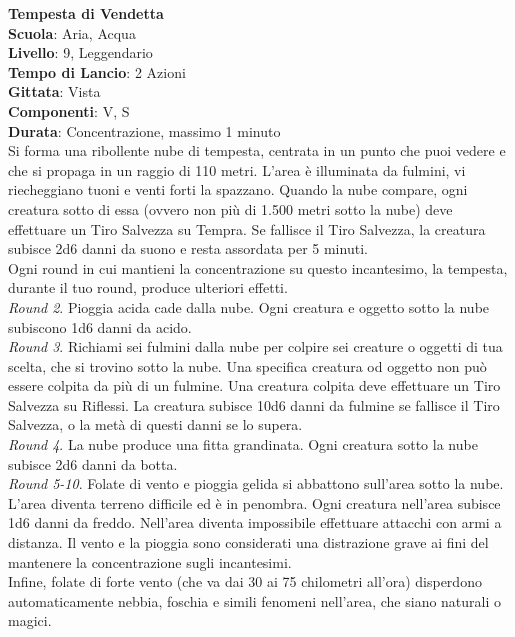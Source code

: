 \begin{multicols}{2}
\medskip\textbf{Tempesta di Vendetta}\\
\textbf{Scuola}: Aria, Acqua\\
\textbf{Livello}: 9, Leggendario\\
\textbf{Tempo di Lancio}: 2 Azioni\\
\textbf{Gittata}: Vista\\
\textbf{Componenti}: V, S\\
\textbf{Durata}: Concentrazione, massimo 1 minuto\\
Si forma una ribollente nube di tempesta, centrata in un punto che puoi vedere e che si propaga in un raggio di 110 metri. L'area è illuminata da fulmini, vi riecheggiano tuoni e venti forti la spazzano. Quando la nube compare, ogni creatura sotto di essa (ovvero non più di 1.500 metri sotto la nube) deve effettuare un Tiro Salvezza su Tempra. Se fallisce il Tiro Salvezza, la creatura subisce 2d6 danni da suono e resta assordata per 5 minuti.\\
Ogni round in cui mantieni la concentrazione su questo incantesimo, la tempesta, durante il tuo round, produce ulteriori effetti.\\
\textit{Round 2}. Pioggia acida cade dalla nube. Ogni creatura e oggetto sotto la nube subiscono 1d6 danni da acido.\\
\textit{Round 3}. Richiami sei fulmini dalla nube per colpire sei creature o oggetti di tua scelta, che si trovino sotto la nube. Una specifica creatura od oggetto non può essere colpita da più di un fulmine. Una creatura colpita deve effettuare un Tiro Salvezza su Riflessi. La creatura subisce 10d6 danni da fulmine se fallisce il Tiro Salvezza, o la metà di questi danni se lo supera. \\
\textit{Round 4}. La nube produce una fitta grandinata. Ogni creatura sotto la nube subisce 2d6 danni da botta.\\
\textit{Round 5-10}. Folate di vento e pioggia gelida si abbattono sull'area sotto la nube. L'area diventa terreno difficile ed è in penombra. Ogni creatura nell'area subisce 1d6 danni da freddo. Nell'area diventa impossibile effettuare attacchi con armi a distanza. Il vento e la pioggia sono considerati una distrazione grave ai fini del mantenere la concentrazione sugli incantesimi.\\ Infine, folate di forte vento (che va dai 30 ai 75 chilometri all'ora) disperdono automaticamente nebbia, foschia e simili fenomeni nell'area, che siano naturali o magici.


\end{multicols}
